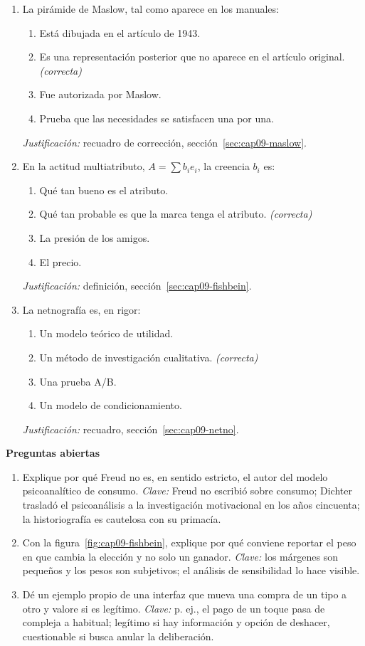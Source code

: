 \begin{enumerate}
  \item La pirámide de Maslow, tal como aparece en los manuales:
  \begin{enumerate}
    \item[a)] Está dibujada en el artículo de 1943.
    \item[b)] Es una representación posterior que no aparece en el artículo original. \textit{(correcta)}
    \item[c)] Fue autorizada por Maslow.
    \item[d)] Prueba que las necesidades se satisfacen una por una.
  \end{enumerate}
  \textit{Justificación:} recuadro de corrección,
  sección~\ref{sec:cap09-maslow}.

  \item En la actitud multiatributo, $A=\sum b_i e_i$, la creencia $b_i$ es:
  \begin{enumerate}
    \item[a)] Qué tan bueno es el atributo.
    \item[b)] Qué tan probable es que la marca tenga el atributo. \textit{(correcta)}
    \item[c)] La presión de los amigos.
    \item[d)] El precio.
  \end{enumerate}
  \textit{Justificación:} definición,
  sección~\ref{sec:cap09-fishbein}.

  \item La netnografía es, en rigor:
  \begin{enumerate}
    \item[a)] Un modelo teórico de utilidad.
    \item[b)] Un método de investigación cualitativa. \textit{(correcta)}
    \item[c)] Una prueba A/B.
    \item[d)] Un modelo de condicionamiento.
  \end{enumerate}
  \textit{Justificación:} recuadro,
  sección~\ref{sec:cap09-netno}.
\end{enumerate}

\textbf{Preguntas abiertas}

\begin{enumerate}
  \item Explique por qué Freud no es, en sentido estricto, el autor del modelo
  psicoanalítico de consumo. \textit{Clave:} Freud no escribió sobre consumo;
  Dichter trasladó el psicoanálisis a la investigación motivacional en los
  años cincuenta; la historiografía es cautelosa con su primacía.
  \item Con la figura~\ref{fig:cap09-fishbein}, explique por qué conviene
  reportar el peso en que cambia la elección y no solo un ganador. \textit{Clave:}
  los márgenes son pequeños y los pesos son subjetivos; el análisis de
  sensibilidad lo hace visible.
  \item Dé un ejemplo propio de una interfaz que mueva una compra de un tipo a
  otro y valore si es legítimo. \textit{Clave:} p. ej., el pago de un toque
  pasa de compleja a habitual; legítimo si hay información y opción de
  deshacer, cuestionable si busca anular la deliberación.
\end{enumerate}

